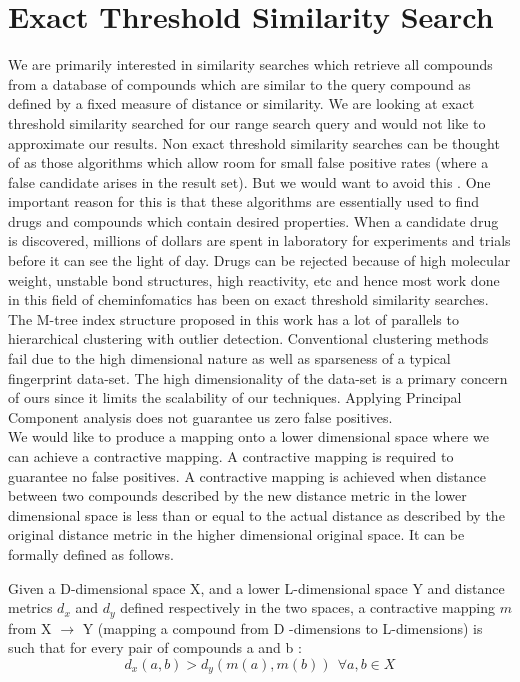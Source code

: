 \section{Exact Threshold Similarity Search}
\label{exact}
We are primarily interested in similarity searches which retrieve all compounds from a database of compounds which are similar to the query compound as defined by a fixed measure of distance or similarity. We are looking at exact threshold similarity searched for our range search query and would not like to approximate our results. Non exact threshold similarity searches can be thought of as those algorithms which allow room for small false positive rates (where a false candidate arises in the result set). But we would want to avoid this . One important reason for this is that these algorithms are essentially used to find drugs and compounds which contain desired properties. When a candidate drug is discovered, millions of dollars are spent in laboratory for experiments and trials before it can see the light of day. Drugs can be rejected because of high molecular weight, unstable bond structures, high reactivity, etc and hence most work done in this field of cheminfomatics has been on exact threshold similarity searches.\\

The M-tree index structure proposed in this work has a lot of parallels to hierarchical clustering with outlier detection. Conventional clustering methods fail due to the high dimensional nature as well as sparseness of a typical fingerprint data-set. The high dimensionality of the data-set is a primary concern of ours since it limits the scalability of our techniques. Applying Principal Component analysis does not guarantee us zero false positives. \\

We would like to produce a mapping onto a lower dimensional space where we can achieve a contractive mapping. A contractive mapping is required to guarantee no false positives. A contractive mapping is achieved when distance between two compounds described by the new distance metric in the lower dimensional space is less than or equal to the actual distance as described by the original distance metric in the higher dimensional original space. It can be formally defined as follows.\\

\begin{dfn}
 Given a D-dimensional space X, and a lower L-dimensional space Y and distance metrics $d_x$ and $d_y$ defined respectively in the two spaces, a contractive mapping $m$ from X $\rightarrow$ Y (mapping a compound from D -dimensions to L-dimensions) is such that for every pair of compounds a and b : \\
\begin{equation}
  d_x(a,b) > d_y(m(a),m(b))~~ \forall a,b \in X 
\end{equation}
\end{dfn}


